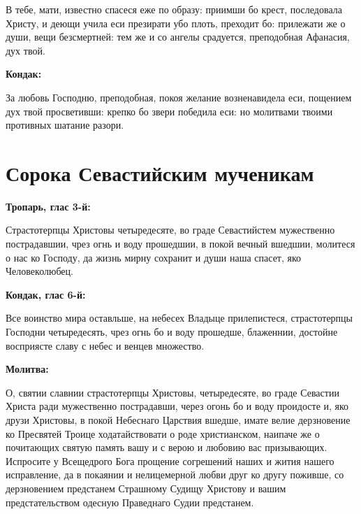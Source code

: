  В тебе, мати, известно спасеся еже по образу: приимши бо крест, последовала Христу, и деющи учила еси презирати убо плоть, преходит бо: прилежати же о души, вещи безсмертней: тем же и со ангелы срадуется, преподобная Афанасия, дух твой.


\bfseries Кондак:\normalfont{}\nopagebreak

 За любовь Господню, преподобная, покоя желание возненавидела еси, пощением дух твой просветивши: крепко бо звери победила еси: но молитвами твоими противных шатание разори.
\mychapterending


 

\section{Сорока Севастийским мученикам}
 

\bfseries Тропарь, глас 3-й:\normalfont{}\nopagebreak


Страстотерпцы Христовы четыредесяте, во граде Севастийстем мужественно пострадавшии, чрез огнь и воду прошедшии, в покой вечный вшедшии, молитеся о нас ко Господу, да жизнь мирну сохранит и души наша спасет, яко Человеколюбец.


\medskip


\bfseries Кондак, глас 6-й:\normalfont{}\nopagebreak


Все воинство мира оставльше, на небесех Владыце прилепистеся, страстотерпцы Господни четыредесять, чрез огнь бо и воду прошедше, блаженнии, достойне восприясте славу с небес и венцев множество.


\medskip


\bfseries Молитва:\normalfont{}\nopagebreak


О, святии славнии страстотерпцы Христовы, четыредесяте, во граде Севастии Христа ради мужественно пострадавши, через огонь бо и воду проидосте и, яко друзи Христовы, в покой Небеснаго Царствия вшедше, имате велие дерзновение ко Пресвятей Троице ходатайствовати о роде христианском, наипаче же о почитающих святую память вашу и с верою и любовию вас призывающих. Испросите у Всещедрого Бога прощение согрешений наших и жития нашего исправление, да в покаянии и нелицемерной любви друг ко другу поживше, со дерзновением предстанем Страшному Судищу Христову и вашим предстательством одесную Праведнаго Судии предстанем.

